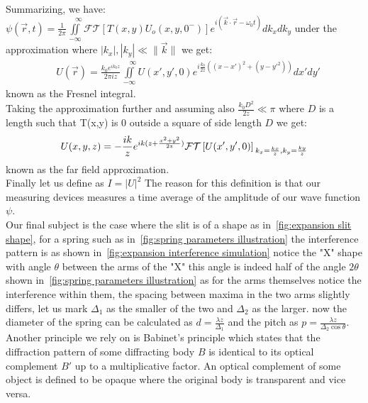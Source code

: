 \\Summarizing, we have:\\
$\psi(\vec{r},t)=\frac{1}{2\pi} \iint\limits_{-\infty}^{\quad \infty}\mathcal{FT}\left[ T(x,y)U_o(x,y,0^-) \right]e^{i \left( \vec{k}\cdot\vec{r}-\omega_0 t \right)}dk_x dk_y$
under the approximation where $|k_x|,|k_y| \ll \|\vec{k}\|$ we get:
\begin{align} \label{eq:nearfield}
    &U(\vec{r})=\frac{k_0 e^{ik_0 z}}{2\pi iz}\iint\limits_{-\infty}^{\quad \infty}U(x',y',0)e^{i\frac{k_0}{2z}((x-x')^2+(y-y'^2))}dx' dy'
\end{align}
known as the Fresnel integral.\\
Taking the approximation further and assuming also $\frac{k_0 D^2}{2z} \ll \pi$ where $D$ is a length such that T(x,y) is 0 outside a square of side length $D$
we get:
\begin{equation}\label{eq:farfield}
    U(x,y,z)=-\frac{ik}{z}e^{ik(z+\frac{x^2+y^2}{2z})}\mathcal{FT}\left[ U(x',y',0) \right]\\
    _{k_x=\frac{kx}{z},k_y=\frac{ky}{z}}
\end{equation}
known as the far field approximation.\\
Finally let us define as $I=|U|^2$ The reason for this definition is that our measuring devices measures a time average of the amplitude of our wave function $\psi$.\\
Our final subject is the case where the slit is of a shape as in~\ref{fig:expansion slit shape}, for a spring such as in~\ref{fig:spring parameters illustration}
the interference pattern is as shown in~\ref{fig:expansion interference simulation} notice the "X" shape with angle $\theta$ between the arms of the "X"
this angle is indeed half of the angle $2\theta$ shown in~\ref{fig:spring parameters illustration}
as for the arms themselves notice the interference within them, the spacing between maxima in the two arms slightly differs,
let us mark $\Delta_1$ as the smaller of the two and $\Delta_2$ as the larger.
now the diameter of the spring can be calculated as
$d=\frac{\lambda z}{\Delta_1}$ and the pitch as $p=\frac{\lambda z}{\Delta_2 \cos \theta}$.\\
Another principle we rely on is Babinet's principle which states that the diffraction pattern of some diffracting body $B$ is identical to its optical complement $B'$ up to a multiplicative factor.
An optical complement of some object is defined to be opaque where the original body is transparent and vice versa.